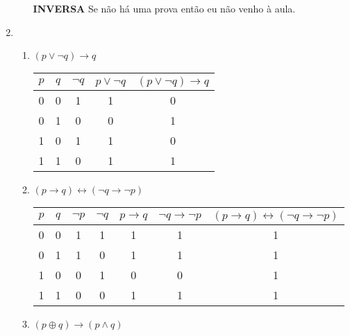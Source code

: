 \documentclass[12pt]{article}
\let\biconditional\leftrightarrow
\begin{document}
\begin{enumerate}
\begin{enumerate}
                \textbf{INVERSA} Se não há uma prova então eu não venho à aula.
        \end{enumerate}
    \item 
        \begin{enumerate}
            \item \( (p \lor \neg q) \to q  \) 
                \begin{center}
                    \begin{tabular}{||c c c c c||} 
                        \hline
                        \( p \)  & \( q \)  & \( \neg q\)  & \( p \lor \neg q \) & \( (p \lor \neg q) \to q  \)  \\ [0.5ex] 
                        \hline\hline
                        0 & 0 & 1 & 1 & 0 \\ 
                        \hline
                        0 & 1 & 0 & 0 & 1 \\
                        \hline
                        1 & 0 & 1 & 1 & 0 \\
                        \hline
                        1 & 1 & 0 & 1 & 1 \\ [1ex]
                        \hline
                    \end{tabular}
                \end{center}
            \item \( (p \to q) \biconditional (\neg q \to \neg p) \) 
                \begin{center}
                    \begin{tabular}{||c c c c c c c||} 
                        \hline
                        \( p \)  & \( q \)  & \( \neg p \)  & \( \neg q\) & \( p \to q  \) & \( \neg q \to \neg p \) & \( (p \to q ) \biconditional (\neg q \to \neg p )  \)   \\ [0.5ex]
                        \hline\hline
                        0 & 0 & 1 & 1 & 1 & 1 & 1\\ 
                        \hline
                        0 & 1 & 1 & 0 & 1 & 1 & 1\\
                        \hline
                        1 & 0 & 0 & 1 & 0 & 0 & 1\\
                        \hline
                        1 & 1 & 0 & 0 & 1 & 1 & 1\\ [1ex]
                        \hline
                    \end{tabular}
                \end{center}
            \item \( (p \oplus q) \to (p \land q)  \) 

\end{enumerate}
\end{enumerate}
\end{document}
